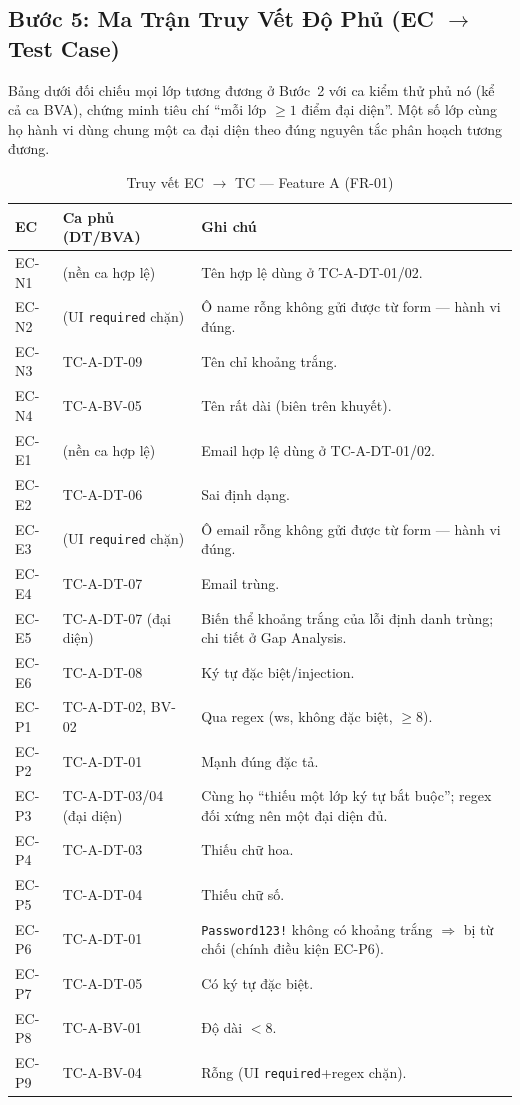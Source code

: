 \documentclass[12pt, a4paper]{report}
\begin{document}
\subsection{Bước 5: Ma Trận Truy Vết Độ Phủ (EC $\to$ Test Case)}
Bảng dưới đối chiếu mọi lớp tương đương ở Bước~2 với ca kiểm thử phủ nó (kể cả ca BVA),
chứng minh tiêu chí ``mỗi lớp $\ge 1$ điểm đại diện''. Một số lớp cùng họ hành vi dùng
chung một ca đại diện theo đúng nguyên tắc phân hoạch tương đương.

\begin{table}[H]
    \centering
    \caption{Truy vết EC $\to$ TC — Feature A (FR-01)}
    \begin{tabularx}{\linewidth}{C{1.8cm} C{3.4cm} X}
        \toprule
        \textbf{EC} & \textbf{Ca phủ (DT/BVA)} & \textbf{Ghi chú} \\
        \midrule
        EC-N1 & (nền ca hợp lệ) & Tên hợp lệ dùng ở TC-A-DT-01/02. \\
        EC-N2 & (UI \texttt{required} chặn) & Ô name rỗng không gửi được từ form --- hành vi đúng. \\
        EC-N3 & TC-A-DT-09 & Tên chỉ khoảng trắng. \\
        EC-N4 & TC-A-BV-05 & Tên rất dài (biên trên khuyết). \\
        EC-E1 & (nền ca hợp lệ) & Email hợp lệ dùng ở TC-A-DT-01/02. \\
        EC-E2 & TC-A-DT-06 & Sai định dạng. \\
        EC-E3 & (UI \texttt{required} chặn) & Ô email rỗng không gửi được từ form --- hành vi đúng. \\
        EC-E4 & TC-A-DT-07 & Email trùng. \\
        EC-E5 & TC-A-DT-07 (đại diện) & Biến thể khoảng trắng của lỗi định danh trùng; chi tiết ở Gap Analysis. \\
        EC-E6 & TC-A-DT-08 & Ký tự đặc biệt/injection. \\
        EC-P1 & TC-A-DT-02, BV-02 & Qua regex (ws, không đặc biệt, $\ge 8$). \\
        EC-P2 & TC-A-DT-01 & Mạnh đúng đặc tả. \\
        EC-P3 & TC-A-DT-03/04 (đại diện) & Cùng họ ``thiếu một lớp ký tự bắt buộc''; regex đối xứng nên một đại diện đủ. \\
        EC-P4 & TC-A-DT-03 & Thiếu chữ hoa. \\
        EC-P5 & TC-A-DT-04 & Thiếu chữ số. \\
        EC-P6 & TC-A-DT-01 & \texttt{Password123!} không có khoảng trắng $\Rightarrow$ bị từ chối (chính điều kiện EC-P6). \\
        EC-P7 & TC-A-DT-05 & Có ký tự đặc biệt. \\
        EC-P8 & TC-A-BV-01 & Độ dài $<8$. \\
        EC-P9 & TC-A-BV-04 & Rỗng (UI \texttt{required}+regex chặn). \\
        \bottomrule
    \end{tabularx}
\end{table}
\end{document}

